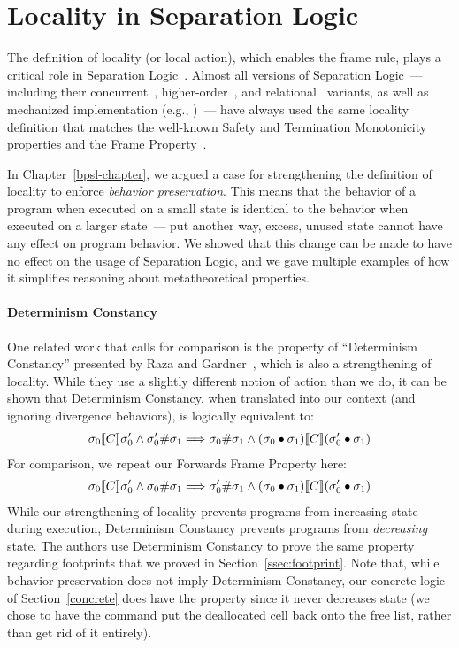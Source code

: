 \label{related-chapter}

\section{Locality in Separation Logic}
\label{related-bpsl}

The definition of locality (or local action), which enables the frame
rule, plays a critical role in Separation
Logic~\cite{io00,reynolds02,yang:fossacs02}. Almost all versions of 
Separation Logic~--- including their
concurrent~\cite{brookes:concur04,ohearn:concur04,coy07},
higher-order~\cite{birkedal05}, and relational~\cite{yang07} variants,
as well as mechanized implementation (e.g., \cite{appel07})~--- have always used
the same locality definition that matches the well-known Safety and
Termination Monotonicity properties and the Frame
Property~\cite{yang:fossacs02}. 

In Chapter~\ref{bpsl-chapter}, we argued a case for strengthening the definition of locality 
to enforce \emph{behavior preservation}. This means that the behavior of a
program when executed on a small state is identical to the behavior when
executed on a larger state~--- put another way, excess, unused state cannot have
any effect on program behavior. We showed that this change can be made to have
no effect on the usage of Separation Logic, and we gave multiple examples of
how it simplifies reasoning about metatheoretical properties. 

\paragraph{Determinism Constancy}
One related work that calls for comparison is the property of
``Determinism Constancy'' presented by Raza and Gardner~\cite{rg09}, which
is also a strengthening of locality. While they use a slightly different notion 
of action than we do, it can be shown that Determinism Constancy, when translated
into our context (and ignoring divergence behaviors), is logically equivalent to:
\begin{align*}
\relate{\den{C}}{\sigma_0}{\sigma_0'} \land \sigma_0' \# \sigma_1 \Longrightarrow 
  \sigma_0 \# \sigma_1 \land \relate{\den{C}}{(\sigma_0 \dt \sigma_1)}{(\sigma_0' \dt \sigma_1)}
\end{align*}
\noindent{}For comparison, we repeat our Forwards Frame Property here:
\begin{align*}
\relate{\den{C}}{\sigma_0}{\sigma_0'} \land \sigma_0 \# \sigma_1 \Longrightarrow 
  \sigma_0' \# \sigma_1 \land \relate{\den{C}}{(\sigma_0 \dt \sigma_1)}{(\sigma_0' \dt \sigma_1)}
\end{align*}
While our strengthening of locality prevents programs from increasing state during
execution, Determinism Constancy prevents programs from \emph{decreasing} state.
The authors use Determinism Constancy to prove the same property regarding footprints
that we proved in Section~\ref{ssec:footprint}. Note that, while behavior preservation
does not imply Determinism Constancy, our concrete logic of Section~\ref{concrete} does
have the property since it never decreases state (we chose to have the \freee{} command put the 
deallocated cell back onto the free list, rather than get rid of it entirely).

